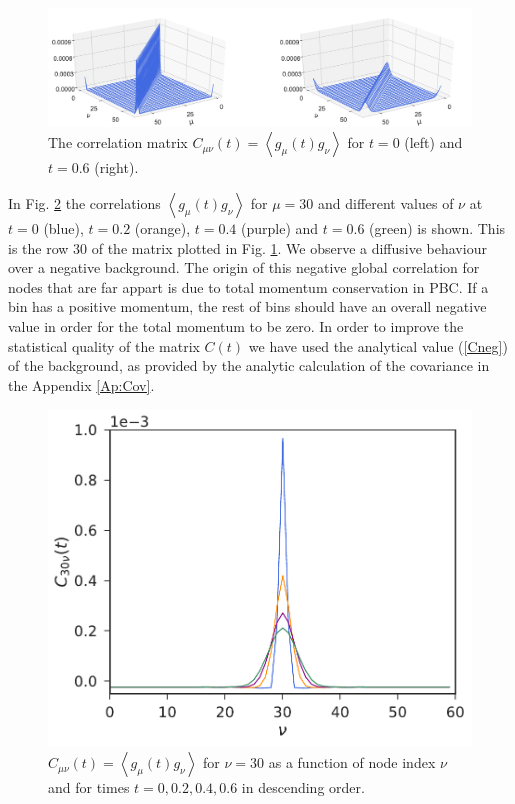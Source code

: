 \documentclass[b5paper,openright,10pt]{book}
\newcommand{\llangle}{\left\langle}
\newcommand{\rrangle}{\right\rangle}
\begin{document}
\begin{figure}[h!]
\centering
\includegraphics[width=\linewidth]{Ct-matrix-PBC}
\caption[Correlation matrix $C(t)$ at $t=0$ and $t=0.6$ for an unconfined fluid]{The   correlation    matrix   $C_{\mu\nu}(t)=\llangle
g_{\mu}(t)  g_\nu\rrangle$ for  $t=0$ (left) and $t=0.6$ (right).}
\label{fig:Ct-matrix-PBC}
\end{figure}

In  Fig.    \ref{fig:Ct-mu30nu-PBC}  the   correlations  $\llangle
g_{\mu}(t)  g_\nu\rrangle$ for  $\mu=30$ and  different values  of
$\nu$ at $t=0$ (blue), $t=0.2$ (orange), $t=0.4$ (purple) and $t= 0.6$ (green) is shown.  This is the row 30 of the matrix plotted
in Fig. \ref{fig:Ct-matrix-PBC}.  We  observe a diffusive
behaviour over  a negative  background.  The  origin of  this negative
global  correlation for  nodes that  are far  appart is  due to  total
momentum conservation in PBC.  If a bin has  a positive momentum, the rest of
bins should  have an  overall negative  value in  order for  the total
momentum to  be zero. In order  to improve the statistical  quality of
the matrix  $C(t)$ we have  used the analytical value  (\ref{Cneg}) of
the  background,  as  provided  by the  analytic  calculation  of  the
covariance in the Appendix \ref{Ap:Cov}.

\begin{figure}[h!]
\centering
\includegraphics[scale=0.41]{Ct-mu30nu-PBC}
\caption[$C_{30\nu}(t)$ for an uncofined fluid]{$C_{\mu\nu}(t)=\llangle  g_{\mu}(t) g_\nu\rrangle$  for $\nu=30$
 as a  function of node index  $\nu$ and for times $t=0, 0.2, 0.4, 0.6$ in descending order.}
 \label{fig:Ct-mu30nu-PBC} 
\end{figure}
\end{document}
